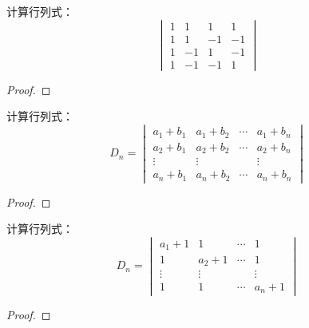 \begin{problem}
计算行列式：
\begin{equation*}
    \begin{vmatrix}
        1 & 1  & 1  & 1  \\
        1 & 1  & -1 & -1 \\
        1 & -1 & 1  & -1 \\
        1 & -1 & -1 & 1
    \end{vmatrix}
\end{equation*}
\end{problem}
\begin{proof}
\end{proof}

\begin{problem}
计算行列式：
\begin{equation*}
    D_n=
    \begin{vmatrix}
        a_{1}+b_{1} & a_{1}+b_{2} & \cdots & a_{1}+b_{n} \\
        a_{2}+b_{1} & a_{2}+b_{2} & \cdots & a_{2}+b_{n} \\
        \vdots      & \vdots      &        & \vdots      \\
        a_{n}+b_{1} & a_{n}+b_{2} & \cdots & a_{n}+b_{n}
    \end{vmatrix}
\end{equation*}
\end{problem}
\begin{proof}
\end{proof}

\begin{problem}
计算行列式：
\begin{equation*}
    D_n=
    \begin{vmatrix}
        a_1+1  & 1      & \cdots & 1      \\
        1      & a_2+1  & \cdots & 1      \\
        \vdots & \vdots &        & \vdots \\
        1      & 1      & \cdots & a_n+1
    \end{vmatrix}
\end{equation*}
\end{problem}
\begin{proof}
\end{proof}

